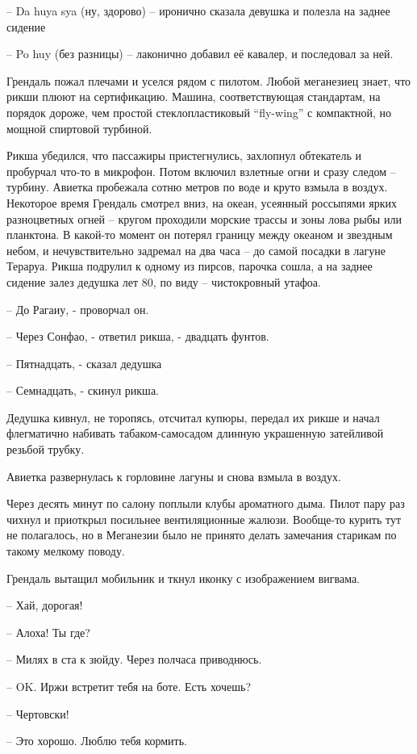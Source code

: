 \documentclass[10pt,final]{book}
\begin{document}
-- Da huya sya (ну, здорово) -- иронично сказала девушка и полезла на заднее сидение

-- Po huy (без разницы) -- лаконично добавил её кавалер, и последовал за ней.

Грендаль пожал плечами и уселся рядом с пилотом. Любой меганезиец знает, что рикши плюют на сертификацию. Машина, соответствующая стандартам, на порядок дороже, чем простой стеклопластиковый ``fly-wing'' с компактной, но мощной спиртовой турбиной.

Рикша убедился, что пассажиры пристегнулись, захлопнул обтекатель и пробурчал что-то в микрофон. Потом включил взлетные огни и сразу следом -- турбину. Авиетка пробежала сотню метров по воде и круто взмыла в воздух. Некоторое время Грендаль смотрел вниз, на океан, усеянный россыпями ярких разноцветных огней -- кругом проходили морские трассы и зоны лова рыбы или планктона. В какой-то момент он потерял границу между океаном и звездным небом, и нечувствительно задремал на два часа -- до самой посадки в лагуне Тераруа. Рикша подрулил к одному из пирсов, парочка сошла, а на заднее сидение залез дедушка лет 80, по виду -- чистокровный утафоа.

-- До Рагаиу, - проворчал он.

-- Через Сонфао, - ответил рикша, - двадцать фунтов.

-- Пятнадцать, - сказал дедушка

-- Семнадцать, - скинул рикша.

Дедушка кивнул, не торопясь, отсчитал купюры, передал их рикше и начал флегматично набивать табаком-самосадом длинную украшенную затейливой резьбой трубку.

Авиетка развернулась к горловине лагуны и снова взмыла в воздух.

Через десять минут по салону поплыли клубы ароматного дыма. Пилот пару раз чихнул и приоткрыл посильнее вентиляционные жалюзи. Вообще-то курить тут не полагалось, но в Меганезии было не принято делать замечания старикам по такому мелкому поводу.

Грендаль вытащил мобильник и ткнул иконку с изображением вигвама.

-- Хай, дорогая!

-- Алоха! Ты где?

-- Милях в ста к зюйду. Через полчаса приводнюсь.

-- OK. Иржи встретит тебя на боте. Есть хочешь?

-- Чертовски!

-- Это хорошо. Люблю тебя кормить.
\end{document}
